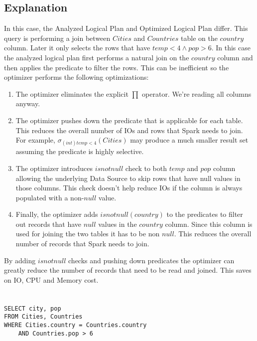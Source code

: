 \documentclass[12pt]{article}
\begin{document}
\subsection*{Explanation}

In this case, the Analyzed Logical Plan and Optimized Logical Plan differ. This query is performing a join between $Cities$ and $Countries$ table on the $country$ column. Later it only selects the rows that have $temp < 4 \wedge pop > 6$. In this case the analyzed logical plan first performs a natural join on the $country$ column and then applies the predicate to filter the rows. This can be inefficient so the optimizer performs the following optimizations:

\begin{enumerate}
\item The optimizer eliminates the explicit $\prod$ operator. We're reading all columns anyway.

\item The optimizer pushes down the predicate that is applicable for each table. This reduces the overall number of IOs and rows that Spark needs to join. For example, $\sigma_{(int)temp < 4}(Cities)$ may produce a much smaller result set assuming the predicate is highly selective.


\item The optimizer introduces $isnotnull$ check to both $temp$ and $pop$ column allowing the underlying Data Source to skip rows that have null values in those columns. This check doesn't help reduce IOs if the column is always populated with a non-$null$ value.

\item Finally, the optimizer adds $isnotnull(country)$ to the predicates to filter out records that have $null$ values in the $country$ column. Since this column is used for joining the two tables it has to be non $null$. This reduces the overall number of records that Spark needs to join.

\end{enumerate}

By adding $isnotnull$ checks and pushing down predicates the optimizer can greatly reduce the number of records that need to be read and joined. This saves on IO, CPU and Memory cost.
\newpage

\section{}
\begin{verbatim}
SELECT city, pop
FROM Cities, Countries
WHERE Cities.country = Countries.country
    AND Countries.pop > 6
\end{verbatim}
\end{document}
